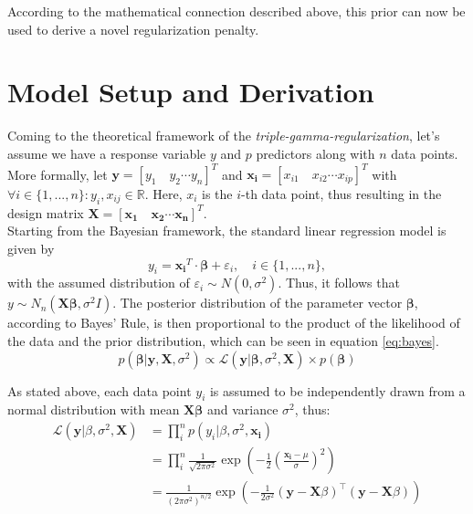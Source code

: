 \documentclass[12pt,a4paper]{article}
\begin{document}
According to the mathematical connection described above, this prior can now be used to derive a novel regularization penalty.


\newpage
\section{Model Setup and Derivation}\label{sec:modelderivation}
Coming to the theoretical framework of the \textit{triple-gamma-regularization}, let's assume we have a response variable $y$ and $p$ predictors along with $n$ data points. More formally, let $\mathbf{y}=[y_1  \quad y_2 \cdots y_n]^T$ and $\mathbf{x_i} = [x_{i1} \quad x_{i2} \cdots x_{ip}]^T$ with $\forall i\in \{1,...,n\}: y_i, x_{ij} \in \mathbb{R}$. Here, $x_i$ is the $i$-th data point, thus resulting in the design matrix $\mathbf{X} = [\mathbf{x_1} \quad \mathbf{x_2} \cdots \mathbf{x_n}]^T$.\\

Starting from the Bayesian framework, the standard linear regression model is given by
\[
y_i = \mathbf{x_i}^T\cdot \mathbf{\beta} + \varepsilon_i, \quad i\in \{1,...,n\}, 
\]
with the assumed distribution of $\varepsilon_i \sim N(0,\sigma^2)$. Thus, it follows that $y\sim N_n(\mathbf{X}\mathbf{\beta},\sigma^2I)$. The posterior distribution of the parameter vector $\mathbf{\beta}$, according to Bayes' Rule, is then proportional to the product of the likelihood of the data and the prior distribution, which can be seen in equation \ref{eq:bayes}.
\begin{equation}\label{eq:bayes}
p(\mathbf{\beta}|\mathbf{y}, \mathbf{X}, \sigma^2) \propto \mathcal{L}(\mathbf{y}|\mathbf{\beta}, \sigma^2, \mathbf{X})\times p(\mathbf{\beta})
\end{equation}	

As stated above, each data point $y_i$ is assumed to be independently drawn from a normal distribution with mean $\mathbf{X}\mathbf{\beta}$ and variance $\sigma^2$, thus:
\begin{align}
\mathcal{L}(\mathbf{y}|\beta, \sigma^2, \mathbf{X}) 	&= \prod_i^n p(y_i|\beta, \sigma^2, \mathbf{x_i}) \nonumber\\
						&= \prod_i^n \frac{1}{\sqrt{2\pi\sigma^2}} \exp\left(-\frac{1}{2}\left(\frac{\mathbf{x_i}-\mu}{\sigma}\right)^2\right) \nonumber\\
						&= \frac{1}{(2\pi\sigma^2)^{n/2}}\exp\left(-\frac{1}{2\sigma^2}(\mathbf{y}-\mathbf{X}\beta)^\top(\mathbf{y}-\mathbf{X}\beta)\right) \label{eq:likelihood}
\end{align}
\end{document}
